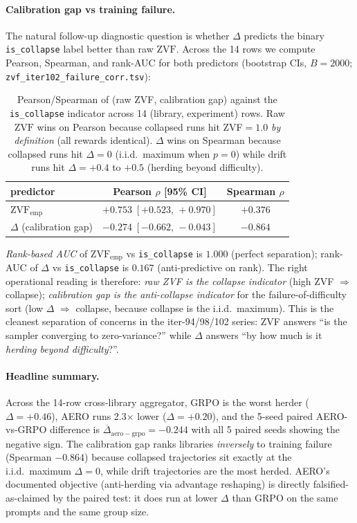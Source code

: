 \paragraph{Calibration gap vs training failure.}
The natural follow-up diagnostic question is whether $\Delta$ predicts
the binary \texttt{is\_collapse} label better than raw $\mathrm{ZVF}$.
Across the 14 rows we compute Pearson, Spearman, and rank-AUC for both
predictors (bootstrap CIs, $B=2000$;
\texttt{zvf\_iter102\_failure\_corr.tsv}):

\begin{table}[ht]\centering\small
\begin{tabular}{lcc}
\toprule
predictor & Pearson $\rho$ [95\% CI] & Spearman $\rho$ \\
\midrule
$\mathrm{ZVF}_{\mathrm{emp}}$          & $+0.753\;[+0.523,\,+0.970]$ & $+0.376$ \\
$\Delta$ (calibration gap) & $-0.274\;[-0.662,\,-0.043]$ & $-0.864$ \\
\bottomrule
\end{tabular}
\caption{Pearson/Spearman of (raw ZVF, calibration gap) against the
\texttt{is\_collapse} indicator across 14 (library, experiment) rows.
Raw $\mathrm{ZVF}$ wins on Pearson because collapsed runs hit ZVF$=1.0$
\emph{by definition} (all rewards identical). $\Delta$ wins on Spearman
because collapsed runs hit $\Delta=0$ (i.i.d.\ maximum when $p=0$) while
drift runs hit $\Delta=+0.4$ to $+0.5$ (herding beyond difficulty).}
\label{tab:zvf-calib-fail}
\end{table}

\noindent
\emph{Rank-based AUC} of $\mathrm{ZVF}_{\mathrm{emp}}$ vs \texttt{is\_collapse}
is $1.000$ (perfect separation); rank-AUC of $\Delta$ vs
\texttt{is\_collapse} is $0.167$ (anti-predictive on rank). The right
operational reading is therefore: \emph{raw ZVF is the collapse indicator}
(high ZVF $\Rightarrow$ collapse); \emph{calibration gap is the
\emph{anti}-collapse indicator} for the failure-of-difficulty sort (low
$\Delta$ $\Rightarrow$ collapse, because collapse is the i.i.d.\ maximum).
This is the cleanest separation of concerns in the iter-94/98/102 series:
ZVF answers ``is the sampler converging to zero-variance?'' while $\Delta$
answers ``by how much is it \emph{herding beyond difficulty}?''.

\paragraph{Headline summary.}
Across the 14-row cross-library aggregator, GRPO is the worst herder
($\Delta=+0.46$), AERO runs 2.3$\times$ lower ($\Delta=+0.20$), and the
5-seed paired AERO-vs-GRPO difference is $\overline{\Delta}_{\mathrm{aero}-\mathrm{grpo}}=-0.244$
with all 5 paired seeds showing the negative sign. The calibration gap
ranks libraries \emph{inversely} to training failure (Spearman $-0.864$)
because collapsed trajectories sit exactly at the i.i.d.\ maximum
$\Delta=0$, while drift trajectories are the most herded. AERO's
documented objective (anti-herding via advantage reshaping) is directly
falsified-as-claimed by the paired test: it does run at lower $\Delta$
than GRPO on the same prompts and the same group size.

